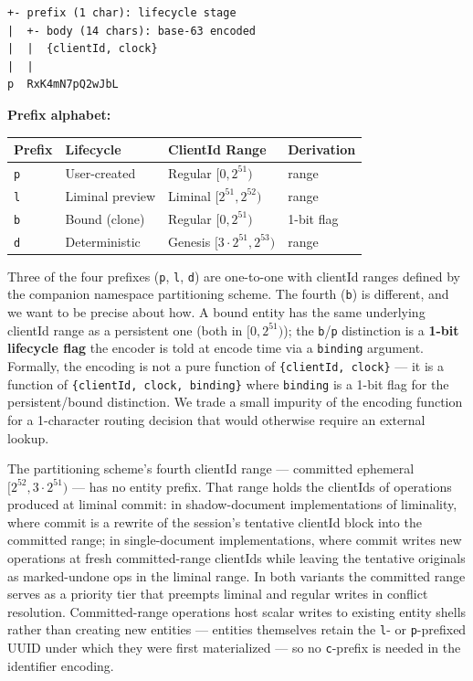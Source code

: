\begin{lstlisting}
+- prefix (1 char): lifecycle stage
|  +- body (14 chars): base-63 encoded
|  |  {clientId, clock}
|  |
p  RxK4mN7pQ2wJbL
\end{lstlisting}

\textbf{Prefix alphabet:}

\begin{center}
\footnotesize
\begin{tabular}{@{}llll@{}}
\toprule
\textbf{Prefix} & \textbf{Lifecycle} & \textbf{ClientId Range} & \textbf{Derivation} \\
\midrule
\texttt{p} & User-created & Regular $[0, 2^{51})$ & range \\
\texttt{l} & Liminal preview & Liminal $[2^{51}, 2^{52})$ & range \\
\texttt{b} & Bound (clone) & Regular $[0, 2^{51})$ & 1-bit flag \\
\texttt{d} & Deterministic & Genesis $[3 \cdot 2^{51}, 2^{53})$ & range \\
\bottomrule
\end{tabular}
\end{center}

Three of the four prefixes (\texttt{p}, \texttt{l}, \texttt{d}) are one-to-one with clientId ranges defined by the companion namespace partitioning scheme\cite{plexus:partitioning}. The fourth (\texttt{b}) is different, and we want to be precise about how. A bound entity has the same underlying clientId range as a persistent one (both in $[0, 2^{51})$); the \texttt{b}/\texttt{p} distinction is a \textbf{1-bit lifecycle flag} the encoder is told at encode time via a \texttt{binding} argument. Formally, the encoding is not a pure function of \texttt{\{clientId, clock\}} --- it is a function of \texttt{\{clientId, clock, binding\}} where \texttt{binding} is a 1-bit flag for the persistent/bound distinction. We trade a small impurity of the encoding function for a 1-character routing decision that would otherwise require an external lookup.

The partitioning scheme's fourth clientId range --- committed ephemeral $[2^{52}, 3 \cdot 2^{51})$ --- has no entity prefix. That range holds the clientIds of operations produced at liminal commit\cite{plexus:liminal}: in shadow-document implementations of liminality, where commit is a rewrite of the session's tentative clientId block into the committed range; in single-document implementations, where commit writes new operations at fresh committed-range clientIds while leaving the tentative originals as marked-undone ops in the liminal range. In both variants the committed range serves as a priority tier that preempts liminal and regular writes in conflict resolution. Committed-range operations host scalar writes to existing entity shells rather than creating new entities --- entities themselves retain the \texttt{l}- or \texttt{p}-prefixed UUID under which they were first materialized --- so no \texttt{c}-prefix is needed in the identifier encoding.

